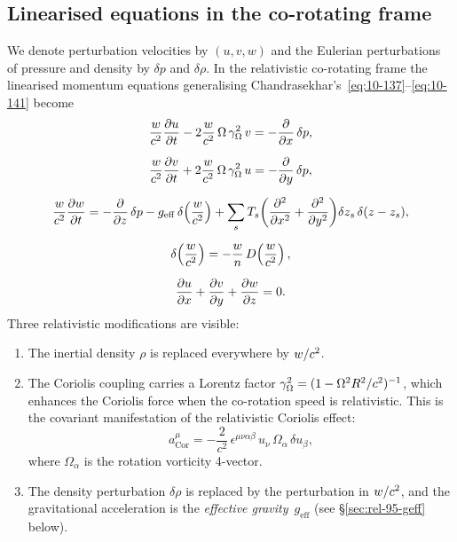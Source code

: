 \subsection{Linearised equations in the co-rotating frame}

We denote perturbation velocities by $(u,v,w)$ and the Eulerian
perturbations of pressure and density by $\delta p$ and $\delta\rho$.
In the relativistic co-rotating frame the linearised momentum equations
generalising Chandrasekhar's~\eqref{eq:10-137}--\eqref{eq:10-141}
become
\begin{gather}
  \frac{w}{c^{2}}\frac{\partial u}{\partial t}
    - 2\frac{w}{c^{2}}\,\Omega\,\gamma_{\Omega}^{2}\,v
    = -\frac{\partial}{\partial x}\,\delta p,
  \label{eq:rel95-mom-x}\\[6pt]
  \frac{w}{c^{2}}\frac{\partial v}{\partial t}
    + 2\frac{w}{c^{2}}\,\Omega\,\gamma_{\Omega}^{2}\,u
    = -\frac{\partial}{\partial y}\,\delta p,
  \label{eq:rel95-mom-y}\\[6pt]
  \frac{w}{c^{2}}\frac{\partial w}{\partial t}
    = -\frac{\partial}{\partial z}\,\delta p
      - g_{\mathrm{eff}}\,\delta\!\left(\frac{w}{c^{2}}\right)
      + \sum_{s}T_{s}\!\left(\frac{\partial^{2}}{\partial x^{2}}
        + \frac{\partial^{2}}{\partial y^{2}}\right)\!\delta z_{s}
        \,\delta(z-z_{s}),
  \label{eq:rel95-mom-z}\\[6pt]
  \delta\!\left(\frac{w}{c^{2}}\right)
    = -\frac{w}{n}\,D\!\left(\frac{w}{c^{2}}\right),
  \label{eq:rel95-cont}\\[6pt]
  \frac{\partial u}{\partial x}
    + \frac{\partial v}{\partial y}
    + \frac{\partial w}{\partial z} = 0.
  \label{eq:rel95-div}
\end{gather}
Three relativistic modifications are visible:

\begin{enumerate}
\item The inertial density $\rho$ is replaced everywhere by
  $w/c^{2}$.

\item The Coriolis coupling carries a Lorentz factor
  $\gamma_{\Omega}^{2} = (1-\Omega^{2}R^{2}/c^{2})^{-1}$, which
  enhances the Coriolis force when the co-rotation speed is
  relativistic.  This is the covariant manifestation of the
  relativistic Coriolis effect:
  \begin{equation}
    a^{\mu}_{\text{Cor}}
      = -\frac{2}{c^{2}}\,\epsilon^{\mu\nu\alpha\beta}\,
        u_{\nu}\,\Omega_{\alpha}\,\delta u_{\beta},
    \label{eq:rel95-coriolis}
  \end{equation}
  where $\Omega_{\alpha}$ is the rotation vorticity 4-vector.

\item The density perturbation $\delta\rho$ is replaced by the
  perturbation in $w/c^{2}$, and the gravitational
  acceleration is the \emph{effective gravity}~$g_{\mathrm{eff}}$
  (see \S\ref{sec:rel-95-geff} below).
\end{enumerate}

